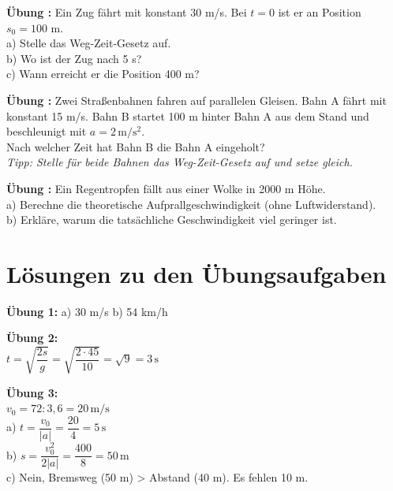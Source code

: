 \documentclass[11pt,a4paper]{article}
\newcounter{uebung}
\newcommand{\uebung}[1]{%
\stepcounter{uebung}%
\vspace{0.2cm}%
\noindent\textbf{Übung \theuebung:} #1%
\vspace{0.2cm}%
}
\begin{document}
\vspace{3cm}

\newpage

\uebung{Ein Zug fährt mit konstant 30 m/s. Bei $t = 0$ ist er an Position $s_0 = 100$ m.\\
a) Stelle das Weg-Zeit-Gesetz auf.\\
b) Wo ist der Zug nach 5 s?\\
c) Wann erreicht er die Position 400 m?}

\vspace{5cm}

\uebung{Zwei Straßenbahnen fahren auf parallelen Gleisen. Bahn A fährt mit konstant 15 m/s. Bahn B startet 100 m hinter Bahn A aus dem Stand und beschleunigt mit $a = 2\,\mathrm{m/s^2}$.\\
Nach welcher Zeit hat Bahn B die Bahn A eingeholt?\\
\textit{Tipp: Stelle für beide Bahnen das Weg-Zeit-Gesetz auf und setze gleich.}}

\vspace{5cm}

\uebung{Ein Regentropfen fällt aus einer Wolke in 2000 m Höhe.\\
a) Berechne die theoretische Aufprallgeschwindigkeit (ohne Luftwiderstand).\\
b) Erkläre, warum die tatsächliche Geschwindigkeit viel geringer ist.}

\vspace{4cm}

\newpage

\section{Lösungen zu den Übungsaufgaben}

\noindent\textbf{Übung 1:} a) 30 m/s \quad b) 54 km/h

\vspace{0.3cm}

\noindent\textbf{Übung 2:}\\
$t = \sqrt{\dfrac{2s}{g}} = \sqrt{\dfrac{2 \cdot 45}{10}} = \sqrt{9} = 3\,\mathrm{s}$

\vspace{0.3cm}

\noindent\textbf{Übung 3:}\\
$v_0 = 72 : 3{,}6 = 20\,\mathrm{m/s}$\\
a) $t = \dfrac{v_0}{|a|} = \dfrac{20}{4} = 5\,\mathrm{s}$\\
b) $s = \dfrac{v_0^2}{2|a|} = \dfrac{400}{8} = 50\,\mathrm{m}$\\
c) Nein, Bremsweg (50 m) > Abstand (40 m). Es fehlen 10 m.
\end{document}
